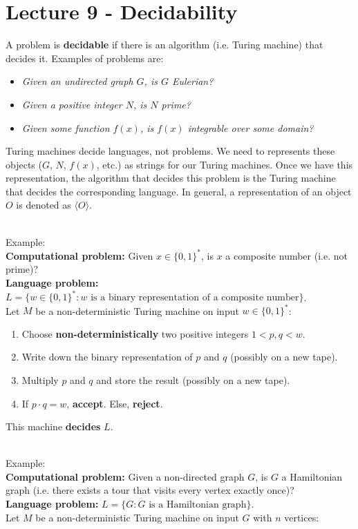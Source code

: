 \documentclass[12pt]{article}
\begin{document}
\section*{Lecture 9 - Decidability}
A problem is \textbf{decidable} if there is an algorithm (i.e. Turing machine) that decides it.
Examples of problems are:

\begin{itemize}
    \item \textit{Given an undirected graph $G$, is $G$ Eulerian?}
    \item \textit{Given a positive integer $N$, is $N$ prime?}
    \item \textit{Given some function $f(x)$, is $f(x)$ integrable over some domain?}
\end{itemize}

\noindent
Turing machines decide languages, not problems.
We need to represents these objects ($G$, $N$, $f(x)$, etc.) as strings for our Turing machines.
Once we have this representation, the algorithm that decides this problem is the Turing machine that decides the corresponding language.
In general, a representation of an object $O$ is denoted as $\langle O \rangle$.

\noindent
\\
Example:\\
\textbf{Computational problem:} Given $x \in \{0, 1\}^*$, is $x$ a composite number (i.e. not prime)?\\
\textbf{Language problem:} $L = \{w \in \{0, 1\}^* : w \text{ is a binary representation of a composite number}\}$.\\
Let $M$ be a non-deterministic Turing machine on input $w \in \{0, 1\}^*$:

\begin{enumerate}
    \item Choose \textbf{non-deterministically} two positive integers $1 < p, q < w$.
    \item Write down the binary representation of $p$ and $q$ (possibly on a new tape).
    \item Multiply $p$ and $q$ and store the result (possibly on a new tape).
    \item If $p \cdot q = w$, \textbf{accept}. Else, \textbf{reject}.
\end{enumerate}

\noindent
This machine \textbf{decides} $L$.

\noindent
\\
Example:\\
\textbf{Computational problem:} Given a non-directed graph $G$, is $G$ a Hamiltonian graph (i.e. there exists a tour that visits every vertex exactly once)?\\
\textbf{Language problem:} $L = \{G : G \text{ is a Hamiltonian graph}\}$.\\
Let $M$ be a non-deterministic Turing machine on input $G$ with $n$ vertices:
\end{document}
